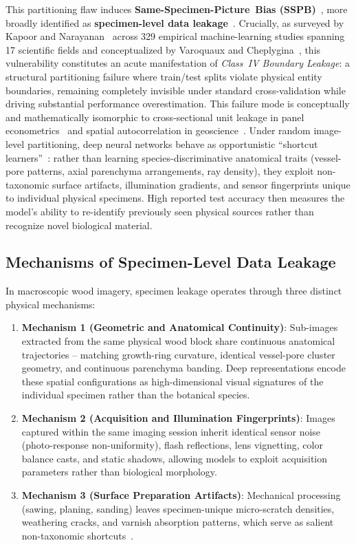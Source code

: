 \documentclass[a4paper,fleqn]{cas-sc}
\begin{document}
This partitioning flaw induces \textbf{\mbox{Same-Specimen-Picture Bias} (SSPB)}~\cite{figueroamata2022}, more broadly identified as \textbf{specimen-level data leakage}~\cite{varoquaux2022,roberts2021,kapoor2023}. Crucially, as surveyed by Kapoor and Narayanan~\cite{kapoor2023} across 329 empirical machine-learning studies spanning 17 scientific fields and conceptualized by Varoquaux and Cheplygina~\cite{varoquaux2022}, this vulnerability constitutes an acute manifestation of \emph{Class~IV Boundary Leakage}: a structural partitioning failure where train/test splits violate physical entity boundaries, remaining completely invisible under standard cross-validation while driving substantial performance overestimation. This failure mode is conceptually and mathematically isomorphic to cross-sectional unit leakage in panel econometrics~\cite{cerqua2026,babii2024} and spatial autocorrelation in geoscience~\cite{roberts2017}. Under random image-level partitioning, deep neural networks behave as opportunistic ``shortcut learners''~\cite{geirhos2020}: rather than learning species-discriminative anatomical traits (vessel-pore patterns, axial parenchyma arrangements, ray density), they exploit non-taxonomic surface artifacts, illumination gradients, and sensor fingerprints unique to individual physical specimens. High reported test accuracy then measures the model's ability to re-identify previously seen physical sources rather than recognize novel biological material.

\subsection{Mechanisms of Specimen-Level Data Leakage}
In macroscopic wood imagery, specimen leakage operates through three distinct physical mechanisms:
\begin{enumerate}
\item \textbf{Mechanism 1 (Geometric and Anatomical Continuity)}: Sub-images extracted from the same physical wood block share continuous anatomical trajectories -- matching growth-ring curvature, identical vessel-pore cluster geometry, and continuous parenchyma banding. Deep representations encode these spatial configurations as high-dimensional visual signatures of the individual specimen rather than the botanical species.
\item \textbf{Mechanism 2 (Acquisition and Illumination Fingerprints)}: Images captured within the same imaging session inherit identical sensor noise (photo-response non-uniformity), flash reflections, lens vignetting, color balance casts, and static shadows, allowing models to exploit acquisition parameters rather than biological morphology.
\item \textbf{Mechanism 3 (Surface Preparation Artifacts)}: Mechanical processing (sawing, planing, sanding) leaves specimen-unique micro-scratch densities, weathering cracks, and varnish absorption patterns, which serve as salient non-taxonomic shortcuts~\cite{geirhos2020}.
\end{enumerate}
\end{document}
